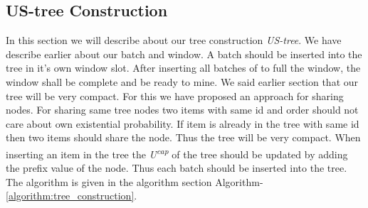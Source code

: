 	\subsection{US-tree Construction}
	In this section we will describe about our tree construction \emph{US-tree}. We have describe earlier about our batch and window. A batch should be inserted into the tree in it's own window slot. After inserting all batches of to full the window, the window shall be complete and be ready to mine. We said earlier section that our tree will be very compact. For this we have proposed an approach for sharing nodes. For sharing same tree nodes two items with same id and order should not care about own existential probability. If item is already in the tree with same id then two items should share the node. Thus the tree will be very compact. When inserting an item in the tree the \emph{U\textsuperscript{cap}}  of the tree should be updated by adding the prefix value of the node. Thus each batch should be inserted into the tree. The algorithm is given in the algorithm section Algorithm-\ref{algorithm:tree_construction}.
	
